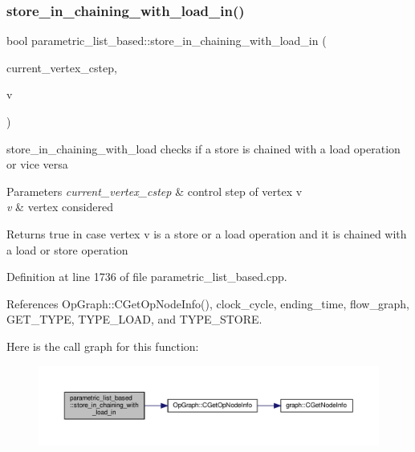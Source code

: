 \subsubsection{\texorpdfstring{store\+\_\+in\+\_\+chaining\+\_\+with\+\_\+load\+\_\+in()}{store\_in\_chaining\_with\_load\_in()}}
{\footnotesize\ttfamily bool parametric\+\_\+list\+\_\+based\+::store\+\_\+in\+\_\+chaining\+\_\+with\+\_\+load\+\_\+in (\begin{DoxyParamCaption}\item[{unsigned int}]{current\+\_\+vertex\+\_\+cstep,  }\item[{\hyperlink{graph_8hpp_abefdcf0544e601805af44eca032cca14}{vertex}}]{v }\end{DoxyParamCaption})\hspace{0.3cm}{\ttfamily [private]}}



store\+\_\+in\+\_\+chaining\+\_\+with\+\_\+load checks if a store is chained with a load operation or vice versa 


\begin{DoxyParams}{Parameters}
{\em current\+\_\+vertex\+\_\+cstep} & control step of vertex v \\
\hline
{\em v} & vertex considered \\
\hline
\end{DoxyParams}
\begin{DoxyReturn}{Returns}
true in case vertex v is a store or a load operation and it is chained with a load or store operation 
\end{DoxyReturn}


Definition at line 1736 of file parametric\+\_\+list\+\_\+based.\+cpp.



References Op\+Graph\+::\+C\+Get\+Op\+Node\+Info(), clock\+\_\+cycle, ending\+\_\+time, flow\+\_\+graph, G\+E\+T\+\_\+\+T\+Y\+PE, T\+Y\+P\+E\+\_\+\+L\+O\+AD, and T\+Y\+P\+E\+\_\+\+S\+T\+O\+RE.

Here is the call graph for this function\+:
\nopagebreak
\begin{figure}[H]
\begin{center}
\leavevmode
\includegraphics[width=350pt]{d7/d47/classparametric__list__based_a6043550d51c621f3b47d804c79428a51_cgraph}
\end{center}
\end{figure}
\mbox{\label{classparametric__list__based_ae448d283c1cda365d88c00d67dd4e447}} 
